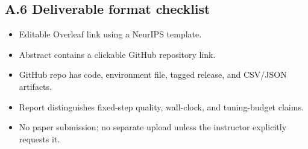 \documentclass[10pt]{article}
\begin{document}
\subsection*{A.6 Deliverable format checklist}
\begin{itemize}
  \item Editable Overleaf link using a NeurIPS template.
  \item Abstract contains a clickable GitHub repository link.
  \item GitHub repo has code, environment file, tagged release, and CSV/JSON artifacts.
  \item Report distinguishes fixed-step quality, wall-clock, and tuning-budget claims.
  \item No paper submission; no separate upload unless the instructor explicitly requests it.
\end{itemize}
\end{document}
